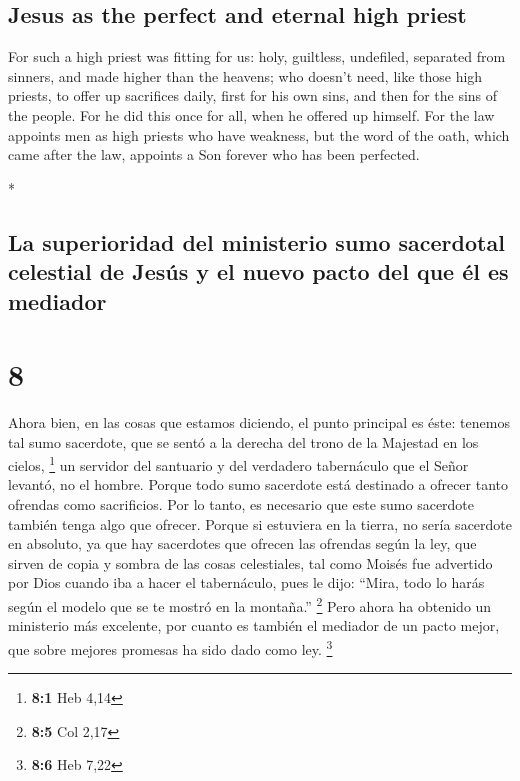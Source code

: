 \begin{paracol}{2}
\begin{otherlanguage}{english}
\hypertarget{jesus-as-the-perfect-and-eternal-high-priest}{%
\subsection{Jesus as the perfect and eternal high
priest}\label{jesus-as-the-perfect-and-eternal-high-priest}}

 For such a high priest was fitting for us: holy,
guiltless, undefiled, separated from sinners, and made higher than the
heavens;  who doesn't need, like those high priests, to
offer up sacrifices daily, first for his own sins, and then for the sins
of the people. For he did this once for all, when he offered up himself.
 For the law appoints men as high priests who have
weakness, but the word of the oath, which came after the law, appoints a
Son forever who has been perfected.

\end{otherlanguage}

\switchcolumn[0]*

\hypertarget{la-superioridad-del-ministerio-sumo-sacerdotal-celestial-de-jesuxfas-y-el-nuevo-pacto-del-que-uxe9l-es-mediador}{%
\subsection{La superioridad del ministerio sumo sacerdotal celestial de
Jesús y el nuevo pacto del que él es
mediador}\label{la-superioridad-del-ministerio-sumo-sacerdotal-celestial-de-jesuxfas-y-el-nuevo-pacto-del-que-uxe9l-es-mediador}}

\hypertarget{section-14}{%
\section{8}\label{section-14}}

 Ahora bien, en las cosas que estamos diciendo, el punto
principal es éste: tenemos tal sumo sacerdote, que se sentó a la derecha
del trono de la Majestad en los cielos, \footnote{\textbf{8:1} Heb 4,14}
 un servidor del santuario y del verdadero tabernáculo que
el Señor levantó, no el hombre.  Porque todo sumo
sacerdote está destinado a ofrecer tanto ofrendas como sacrificios. Por
lo tanto, es necesario que este sumo sacerdote también tenga algo que
ofrecer.  Porque si estuviera en la tierra, no sería
sacerdote en absoluto, ya que hay sacerdotes que ofrecen las ofrendas
según la ley,  que sirven de copia y sombra de las cosas
celestiales, tal como Moisés fue advertido por Dios cuando iba a hacer
el tabernáculo, pues le dijo: ``Mira, todo lo harás según el modelo que
se te mostró en la montaña.'' \footnote{\textbf{8:5} Col 2,17}
 Pero ahora ha obtenido un ministerio más excelente, por
cuanto es también el mediador de un pacto mejor, que sobre mejores
promesas ha sido dado como ley. \footnote{\textbf{8:6} Heb 7,22}


\end{paracol}
